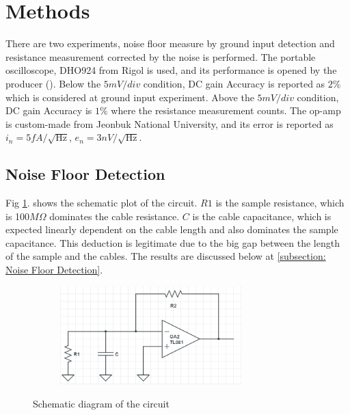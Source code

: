 \documentclass{article}
\begin{document}
\section{Methods}
There are two experiments, noise floor measure by ground input detection and resistance measurement corrected by the noise is performed.
The portable oscilloscope, DHO924 from Rigol is used, and its performance is opened by the producer (\cite{Rigol}).
Below the $5mV/div$ condition, DC gain Accuracy is reported as $2\%$ which is considered at ground input experiment.
Above the $5mV/div$ condition, DC gain Accuracy is $1\%$ where the resistance measurement counts.
The op-amp is custom-made from Jeonbuk National University, and its error is reported as $i_n = 5 fA/\sqrt{\mathrm{Hz}}$, $e_n = 3 nV/\sqrt{\mathrm{Hz}}$.

\subsection{Noise Floor Detection}
Fig \ref{fig: noise floor circuit plot}. shows the schematic plot of the circuit.
$R1$ is the sample resistance, which is 100$M\Omega$ dominates the cable resistance.
$C$ is the cable capacitance, which is expected linearly dependent on the cable length and also dominates the sample capacitance.
This deduction is legitimate due to the big gap between the length of the sample and the cables.
The results are discussed below at \ref{subsection: Noise Floor Detection}.
\begin{figure}[H]
    \centering
    \begin{subfigure}[b]{7cm}
        \centering
        \includegraphics[width=7cm]{./figs/ciruit.png}
        \caption{}
    \end{subfigure}
    \hfill
    \caption{Schematic diagram of the circuit}
    \label{fig: noise floor circuit plot}
\end{figure}
\end{document}
